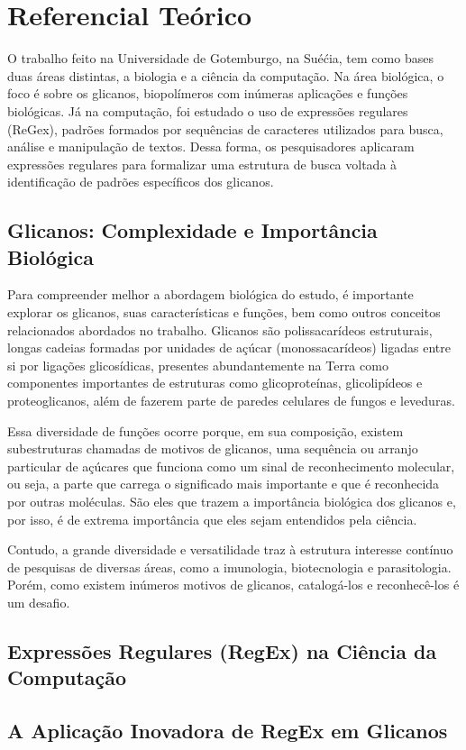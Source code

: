 \chapter{Referencial Teórico}

O trabalho feito na Universidade de Gotemburgo, na Suéćia, tem como bases duas áreas distintas, a biologia e a ciência da computação. Na área biológica, o foco é sobre os glicanos, biopolímeros com inúmeras aplicações e funções biológicas. Já na computação, foi estudado o uso de expressões regulares (ReGex), padrões formados por sequências de caracteres utilizados para busca, análise e manipulação de textos. Dessa forma, os pesquisadores aplicaram expressões regulares para formalizar uma estrutura de busca voltada à identificação de padrões específicos dos glicanos.

\section{Glicanos: Complexidade e Importância Biológica}

Para compreender melhor a abordagem biológica do estudo, é importante explorar os glicanos, suas características e funções, bem como outros conceitos relacionados abordados no trabalho. Glicanos são polissacarídeos estruturais, longas cadeias formadas por unidades de açúcar (monossacarídeos) ligadas entre si por ligações glicosídicas, presentes abundantemente na Terra como componentes importantes de estruturas como glicoproteínas, glicolipídeos e proteoglicanos, além de fazerem parte de paredes celulares de fungos e leveduras.

Essa diversidade de funções ocorre porque, em sua composição, existem subestruturas chamadas de motivos de glicanos, uma sequência ou arranjo particular de açúcares que funciona como um sinal de reconhecimento molecular, ou seja, a parte que carrega o significado mais importante e que é reconhecida por outras moléculas. São eles que trazem a importância biológica dos glicanos e, por isso, é de extrema importância que eles sejam entendidos pela ciência. 

Contudo, a grande diversidade e versatilidade traz à estrutura interesse contínuo de pesquisas de diversas áreas, como a imunologia, biotecnologia e parasitologia. Porém, como existem inúmeros motivos de glicanos, catalogá-los e reconhecê-los é um desafio.

\section{Expressões Regulares (RegEx) na Ciência da Computação}

\section{A Aplicação Inovadora de RegEx em Glicanos}
